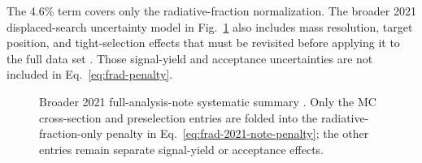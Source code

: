 The 4.6\% term covers only the radiative-fraction normalization. The broader 2021
displaced-search uncertainty model in Fig.~\ref{fig:2021-syst-table-note} also includes
mass resolution, target position, and tight-selection effects that must be revisited
before applying it to the full data set \cite[Sec.~9,
Table~58]{HPS2021FullAnalysisNote}. Those signal-yield and acceptance uncertainties are
not included in Eq.~\eqref{eq:frad-penalty}.

\begin{figure}[H]
\centering
{}
\caption{Broader 2021 full-analysis-note systematic summary
\cite{HPS2021FullAnalysisNote}. Only the MC cross-section and preselection entries
are folded into the radiative-fraction-only penalty in
Eq.~\eqref{eq:frad-2021-note-penalty}; the other entries remain separate signal-yield
or acceptance effects.}
\label{fig:2021-syst-table-note}
\end{figure}
